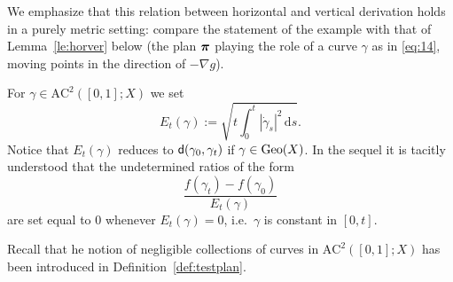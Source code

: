 \documentclass[reqno,11pt]{article}
\numberwithin{equation}{section}
\newcommand{\ppi}{{\mbox{\boldmath$\pi$}}}
\newcommand{\sfd}{{\sf d}}
\renewcommand{\d}{{\mathrm d}}
\newcommand{\geo}{{\rm{Geo}}}                       %
\newcommand{\AC}[3]{\mathrm{AC}^{#1}(#2;#3)}
\begin{document}
We emphasize that this relation between horizontal and vertical
derivation holds in a purely metric setting: compare the statement
of the example with that of Lemma~\ref{le:horver} below (the plan
$\ppi$ playing the role of a curve $\gamma$ as in \eqref{eq:14},
moving points in the direction of $-\nabla g$).

For $\gamma\in \AC2{[0,1]}X $ we set
\begin{equation}\label{eq:moregenerald}
E_t(\gamma):=\sqrt{t\int_0^t|\dot\gamma_s|^2\,\d s}.
\end{equation}
Notice that $E_t(\gamma)$ reduces to $\sfd(\gamma_0,\gamma_t)$ if
$\gamma\in\geo(X)$. In the sequel it is tacitly understood that the
undetermined ratios of the form
$$
\frac{f(\gamma_t)-f(\gamma_0)}{E_t(\gamma)}
$$
are set equal to 0 whenever $E_t(\gamma)=0$, i.e.~$\gamma$ is
constant in $[0,t]$.

Recall that he notion of negligible collections of curves in
$\AC2{[0,1]}X$ has been introduced in Definition~\ref{def:testplan}.
\end{document}
